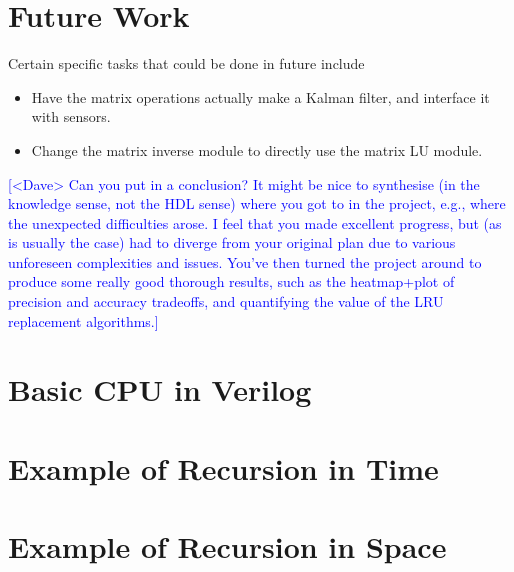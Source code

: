 \documentclass[12pt]{article}
\newcommand{\note}[2][red]{\textcolor{#1}{#2}}
\newcommand{\notedme}[1]{\note[blue]{[<Dave> #1]}}
\begin{document}
\section{Future Work}

Certain specific tasks that could be done in future include

\begin{itemize}
	\item Have the matrix operations actually make a Kalman filter, and interface it with sensors.
	\item Change the matrix inverse module to directly use the matrix LU module.
\end{itemize}

\notedme{Can you put in a conclusion? It might be nice to synthesise (in the knowledge sense, not the HDL sense) where you got to in the project, e.g., where the unexpected difficulties arose. I feel that you made excellent progress, but (as is usually the case) had to diverge from your original plan due to various unforeseen complexities and issues. You've then turned the project around to produce some really good thorough results, such as the heatmap+plot of precision and accuracy tradeoffs, and quantifying the value of the LRU replacement algorithms.}

\printbibliography

\appendix

\renewcommand{\thesection}{Appendix \Alph{section}}

\section{Basic CPU in Verilog}
\label{verilog_cpu}



\section{Example of Recursion in Time}
\label{recursion_time}



\section{Example of Recursion in Space}
\label{recursion_space}


\end{document}
